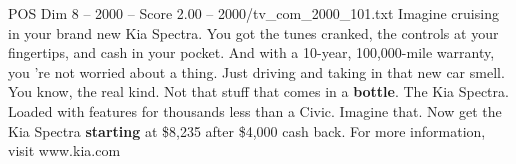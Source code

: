 \begin{textsample}{POS Dim 8 – 2000 – Score 2.00 – 2000/tv\_com\_2000\_101.txt}  \label{ex:f8_pos_036}
Imagine cruising in your brand new Kia Spectra.
You got the tunes cranked, the controls at your fingertips, and cash in your pocket.
And with a 10-year, 100,000-mile warranty, you 're not worried about a thing.
Just driving and taking in that new car smell.
You know, the real kind.
Not that stuff that comes in a \textbf{bottle}.
The Kia Spectra.
Loaded with features for thousands less than a Civic.
Imagine that.
Now get the Kia Spectra \textbf{starting} at \$8,235 after \$4,000 cash back.
For more information, visit www.kia.com

\end{textsample}
